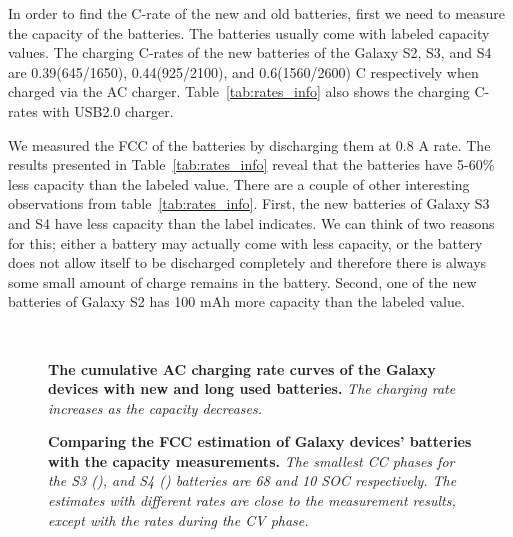 \documentclass[journal]{IEEEtran}
\begin{document}
In order to find the C-rate of the new and old batteries, first we need to measure the capacity of the batteries. The batteries usually come with labeled capacity values. The  charging C-rates of the new batteries of the Galaxy S2, S3, and S4 are 0.39(645/1650), 0.44(925/2100), and 0.6(1560/2600) C respectively when charged via the AC charger. Table~\ref{tab:rates_info} also shows the charging C-rates with USB2.0 charger. 

We measured the FCC of the batteries by discharging them at 0.8 A rate. The results presented in Table~\ref{tab:rates_info} reveal that the batteries have 5-60\% less capacity than the labeled value. There are a couple of other interesting observations from table~\ref{tab:rates_info}.  First, the new batteries of Galaxy S3 and S4 have less capacity than the label indicates. We can think of two reasons for this; either a battery may actually come with less capacity, or the battery does not allow itself to be discharged completely and therefore there is always some small amount of charge remains in the battery. Second, one of the new batteries of Galaxy S2 has 100 mAh more capacity than the labeled value. 




\begin{figure}[t]
  \begin{center}
  \\
\caption{{\bf The cumulative AC charging rate curves of the Galaxy devices with new and long used batteries. }{\sl The charging rate increases as the capacity decreases.}}
\label{fig:all_charging}
 \end{center}
 \end{figure}


\begin{figure*}[t]
  \begin{center}

\caption{{\bf Comparing the FCC estimation of Galaxy devices' batteries with the capacity measurements. }{\sl The smallest CC phases for the S3 (), and S4 () batteries are 68 and 10 SOC respectively. The estimates with different rates are close to the measurement results, except with the rates during the CV phase.}}
    \label{fig:fcc_compare}
\end{center}
 \end{figure*}
\end{document}
